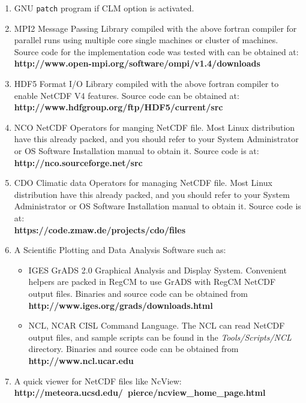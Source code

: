 \begin{enumerate}
\item GNU \verb=patch= program if CLM option is activated.
\item MPI2 Message Passing Library compiled with the above fortran compiler
for parallel runs using multiple core single machines or cluster of machines.
Source code for the implementation code was tested with can be obtained at: \\
{\bf http://www.open-mpi.org/software/ompi/v1.4/downloads}
\item HDF5 Format I/O Library compiled with the above fortran compiler to
enable NetCDF V4 features. Source code can be obtained at: \\
{\bf http://www.hdfgroup.org/ftp/HDF5/current/src}
\item NCO NetCDF Operators for manging NetCDF file. Most Linux distribution
have this already packed, and you should refer to your System Administrator or
OS Software Installation manual to obtain it. Source code is at: \\
{\bf http://nco.sourceforge.net/src}
\item CDO Climatic data Operators for managing NetCDF file. Most Linux
distribution have this already packed, and you should refer to your System
Administrator or OS Software Installation manual to obtain it.
Source code is at: \\
{\bf https://code.zmaw.de/projects/cdo/files}
\item A Scientific Plotting and Data Analysis Software such as:
\begin{itemize}
\item IGES GrADS 2.0 Graphical Analysis and Display System. Convenient helpers
are packed in RegCM to use GrADS with RegCM NetCDF output files.
Binaries and source code can be obtained from \\
{\bf http://www.iges.org/grads/downloads.html}
\item NCL, NCAR CISL Command Language. The NCL can read NetCDF output files, and
sample scripts can be found in the {\em Tools/Scripts/NCL} directory.
Binaries and source code can be obtained from \\
{\bf http://www.ncl.ucar.edu}
\end{itemize}
\item A quick viewer for NetCDF files like NcView: \\
{\bf http://meteora.ucsd.edu/~pierce/ncview\_home\_page.html}
\end{enumerate}

